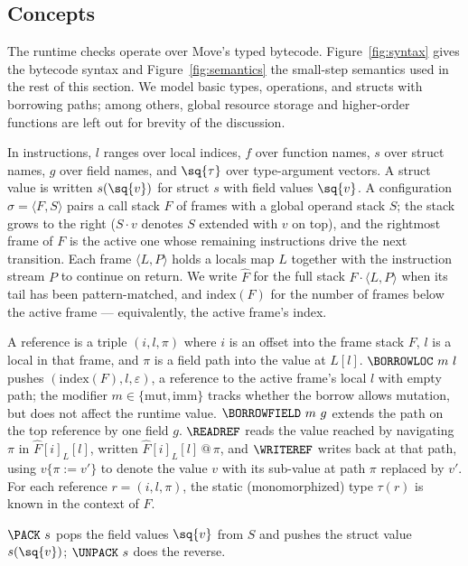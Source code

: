\subsection{Concepts}
\label{sec:concepts}

The runtime checks operate over Move's typed bytecode.
Figure~\ref{fig:syntax} gives the bytecode syntax and Figure~\ref{fig:semantics} the small-step semantics used in the rest of this section.
We model basic types, operations, and structs with borrowing paths; among others, global resource storage and higher-order functions are left out for brevity of the discussion.

In instructions, $l$ ranges over local indices, $f$ over function names, $s$ over struct names, $g$ over field names, and $\sq{\tau}$ over type-argument vectors.
A struct value is written $s(\sq{v})$ for struct $s$ with field values $\sq{v}$.
A configuration $\sigma = \langle F, S\rangle$ pairs a call stack $F$ of frames with a global operand stack $S$; the stack grows to the right ($S \cdot v$ denotes $S$ extended with $v$ on top), and the rightmost frame of $F$ is the active one whose remaining instructions drive the next transition.
Each frame $\langle L, P\rangle$ holds a locals map $L$ together with the instruction stream $P$ to continue on return.
We write $\hat F$ for the full stack $F \cdot \langle L, P\rangle$ when its tail has been pattern-matched, and $\mathrm{index}(F)$ for the number of frames below the active frame --- equivalently, the active frame's index.

A reference is a triple $(i, l, \pi)$ where $i$ is an offset into the frame stack $F$, $l$ is a local in that frame, and $\pi$ is a field path into the value at $L[l]$.
$\BORROWLOC\ m\ l$ pushes $(\mathrm{index}(F), l, \varepsilon)$, a reference to the active frame's local $l$ with empty path; the modifier $m \in \{\mathrm{mut}, \mathrm{imm}\}$ tracks whether the borrow allows mutation, but does not affect the runtime value.
$\BORROWFIELD\ m\ g$ extends the path on the top reference by one field $g$.
$\READREF$ reads the value reached by navigating $\pi$ in $\hat F[i]_L[l]$, written $\hat F[i]_L[l] \,@\, \pi$, and $\WRITEREF$ writes back at that path, using $v\{\pi := v'\}$ to denote the value $v$ with its sub-value at path $\pi$ replaced by $v'$.
For each reference $r = (i, l, \pi)$, the static (monomorphized) type $\tau(r)$ is known in the context of $F$.

$\PACK\ s$ pops the field values $\sq{v}$ from $S$ and pushes the struct value $s(\sq{v})$; $\UNPACK\ s$ does the reverse.

